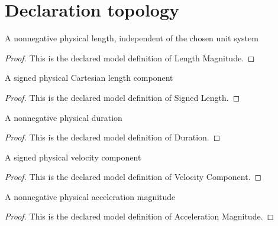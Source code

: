\section{Declaration topology}
\begin{definition}
  \label{def:physics:phyx-mini-0741:phyxminiproblems-problemphyxmini0741-lengthmagnitude}
  A nonnegative physical length, independent of the chosen unit system
\end{definition}
\begin{proof}
  This is the declared model definition of Length Magnitude.
\end{proof}
\begin{definition}
  \label{def:physics:phyx-mini-0741:phyxminiproblems-problemphyxmini0741-signedlength}
  A signed physical Cartesian length component
\end{definition}
\begin{proof}
  This is the declared model definition of Signed Length.
\end{proof}
\begin{definition}[Duration]
  \label{def:physics:phyx-mini-0741:phyxminiproblems-problemphyxmini0741-duration}
  A nonnegative physical duration
\end{definition}
\begin{proof}
  This is the declared model definition of Duration.
\end{proof}
\begin{definition}
  \label{def:physics:phyx-mini-0741:phyxminiproblems-problemphyxmini0741-velocitycomponent}
  A signed physical velocity component
\end{definition}
\begin{proof}
  This is the declared model definition of Velocity Component.
\end{proof}
\begin{definition}
  \label{def:physics:phyx-mini-0741:phyxminiproblems-problemphyxmini0741-accelerationmagnitude}
  A nonnegative physical acceleration magnitude
\end{definition}
\begin{proof}
  This is the declared model definition of Acceleration Magnitude.
\end{proof}
